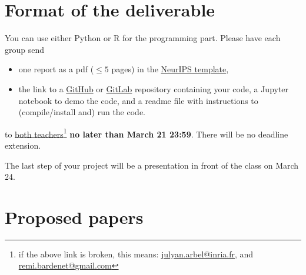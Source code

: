 \documentclass[12pt]{article}%
\begin{document}
\section{Format of the deliverable}
You can use either Python or R for the programming part. Please have each group send
\begin{itemize}
\item one report as a pdf ($\leq 5$ pages) in the \href{https://www.overleaf.com/latex/templates/neurips-2020/mnshsmqkjsqz}{NeurIPS template},
\item the link to a \href{https://github.com/}{GitHub} or  \href{https://about.gitlab.com/}{GitLab} repository containing your code, a Jupyter notebook to demo the code, and a readme file with instructions to (compile/install and) run the code.
\end{itemize} to \href{mailto:julyan.arbel@inria.fr,remi.bardenet@gmail.com}{both teachers}\footnote{if the above link is broken, this means: \href{mailto:julyan.arbel@inria.fr}{julyan.arbel@inria.fr}, and \href{mailto:remi.bardenet@gmail.com}{remi.bardenet@gmail.com}} {\bf no later than March 21 23:59}. There will be no deadline extension.

The last step of your project will be a presentation in front of the class on March 24.

\section{Proposed papers}
\label{s:papers}


\end{document}
